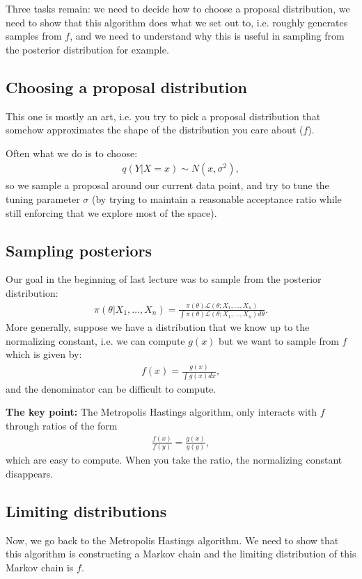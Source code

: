\documentclass[twoside,12pt]{article}
\begin{document}
Three tasks remain: we need to decide how to choose a proposal distribution, we need to show that this algorithm does what we set out to, i.e. roughly generates samples from $f$, and we need to understand why this is useful in sampling from the posterior distribution for example.

\subsection{Choosing a proposal distribution}
This one is mostly an art, i.e. you try to pick a proposal distribution that somehow approximates the shape of the distribution you care about ($f$). 

Often what we do is to choose:
\begin{align*}
q(Y | X = x) \sim N(x, \sigma^2),
\end{align*}
so we sample a proposal around our current data point, and try to tune the tuning parameter $\sigma$ (by trying to maintain a reasonable acceptance ratio while still enforcing that we explore most of the space). 

\subsection{Sampling posteriors}
Our goal in the beginning of last lecture was to sample from the posterior distribution:
\begin{align*}
\pi(\theta | X_1,\ldots,X_n) = \frac{\pi(\theta) \mathcal{L}(\theta ; X_1,\ldots,X_n)} {\int \pi(\theta) \mathcal{L}(\theta ; X_1,\ldots,X_n) d\theta}.
\end{align*}
More generally, suppose we have a distribution that we know up to the normalizing constant, i.e. we can compute $g(x)$ but we want to sample from $f$ which is given by:
\begin{align*}
f(x) = \frac{g(x)}{\int g(x) dx },
\end{align*}
and the denominator can be difficult to compute.

{\bf The key point: } The Metropolis Hastings algorithm, only interacts with $f$ through ratios of the form \begin{align*}
\frac{f(x)}{f(y)} = \frac{g(x)}{g(y)},
\end{align*}
which are easy to compute. When you take the ratio, the normalizing constant disappears.

\subsection{Limiting distributions}
Now, we go back to the Metropolis Hastings algorithm. We need to show that this algorithm is constructing a Markov chain and the limiting distribution of this Markov chain is $f$.
\end{document}
